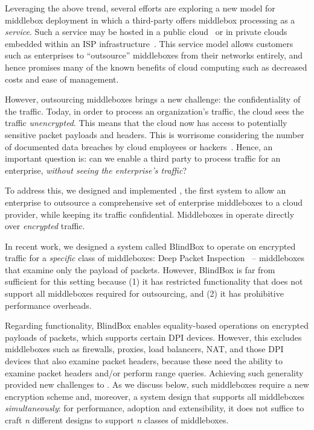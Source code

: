 Leveraging the above trend, several efforts are exploring a new model for middlebox deployment in which a third-party offers middlebox processing as a  
\emph{service}.
Such a service may be hosted in a public cloud~\cite{aplomb,zscaler,aryaka} or in private clouds embedded within an ISP 
infrastructure~\cite{domain20, telefonica}.  
This service model allows customers such as enterprises to ``outsource'' middleboxes from their networks entirely, and hence promises many of the known benefits of cloud computing  such as decreased costs and ease of management.%

However, outsourcing middleboxes brings a new challenge: the confidentiality of the traffic. 
Today, in order to process an organization's traffic, the cloud sees the traffic {\em unencrypted}.  This means that the cloud 
now has access to potentially sensitive packet payloads and headers. This is 
worrisome considering the number of documented data breaches by cloud employees or hackers~\cite{PrivacyRecords,databreach}.
Hence, an important question is: can we enable a third party to process traffic for an enterprise, {\em without seeing the enterprise's traffic}?

To address this, we designed and implemented \sys, the first system to allow an enterprise to outsource  a comprehensive set of enterprise middleboxes  to a cloud provider, while keeping its traffic confidential. 
Middleboxes in \sys operate directly over {\it encrypted} traffic. %


In recent work, we designed a system called BlindBox to operate on encrypted traffic for a {\em specific} class of middleboxes: Deep Packet Inspection~\cite{blindbox} -- middleboxes that examine only the payload of packets. 
However, BlindBox is far from sufficient for this setting because
 (1) it has restricted functionality that does not support all middleboxes required for outsourcing, and (2) it has prohibitive performance overheads.
 
 Regarding functionality, BlindBox enables equality-based operations on  encrypted payloads of packets, which supports certain DPI devices. However, this excludes middleboxes such as firewalls, proxies, load balancers, NAT,  and those DPI devices that also examine packet headers, because these need the ability to examine packet headers and/or perform range queries. 
 Achieving such generality provided new challenges to \sys. 
As we discuss below, such middleboxes require a new encryption scheme and, moreover, a system design that supports all middleboxes {\it simultaneously}: for performance, adoption and extensibility, it does not suffice to craft {\it n} different designs to support {\it n} classes of middleboxes. 

